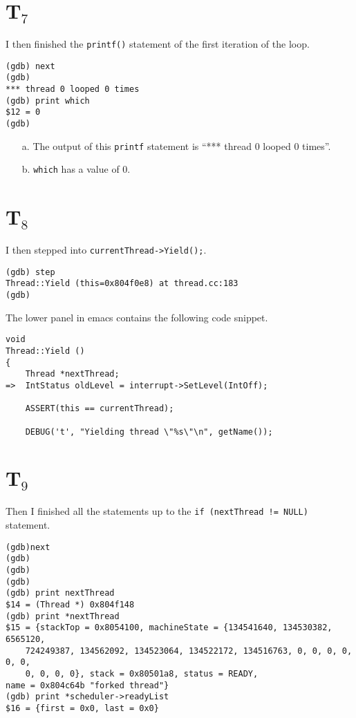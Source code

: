 \documentclass[letterpaper, 10pt]{article}
\begin{document}
	\section*{T$_7$}

	I then finished the {\tt printf()} statement of the first iteration of the loop.

	\begin{verbatim}
(gdb) next
(gdb)
*** thread 0 looped 0 times
(gdb) print which
$12 = 0
(gdb)
	\end{verbatim}

	\begin{itemize}
		\item[a.]{
		The output of this {\tt printf} statement is ``*** thread 0 looped 0 times''.
		}
		\item[b.]{
		{\tt which} has a value of 0.
		}
	\end{itemize}

	\section*{T$_8$}

	I then stepped into {\tt currentThread->Yield();}.

	\begin{verbatim}
(gdb) step
Thread::Yield (this=0x804f0e8) at thread.cc:183
(gdb)
	\end{verbatim}

	The lower panel in emacs contains the following code snippet.

	\begin{verbatim}
void
Thread::Yield ()
{
    Thread *nextThread;
=>  IntStatus oldLevel = interrupt->SetLevel(IntOff);

    ASSERT(this == currentThread);

    DEBUG('t', "Yielding thread \"%s\"\n", getName());
	\end{verbatim}

	\section*{T$_9$}

	Then I finished all the statements up to the {\tt if (nextThread != NULL)} statement.

	\begin{verbatim}
(gdb)next
(gdb)
(gdb)
(gdb)
(gdb) print nextThread
$14 = (Thread *) 0x804f148
(gdb) print *nextThread
$15 = {stackTop = 0x8054100, machineState = {134541640, 134530382, 6565120,
	724249387, 134562092, 134523064, 134522172, 134516763, 0, 0, 0, 0, 0, 0,
	0, 0, 0, 0}, stack = 0x80501a8, status = READY,
name = 0x804c64b "forked thread"}
(gdb) print *scheduler->readyList
$16 = {first = 0x0, last = 0x0}
	\end{verbatim}
\end{document}
